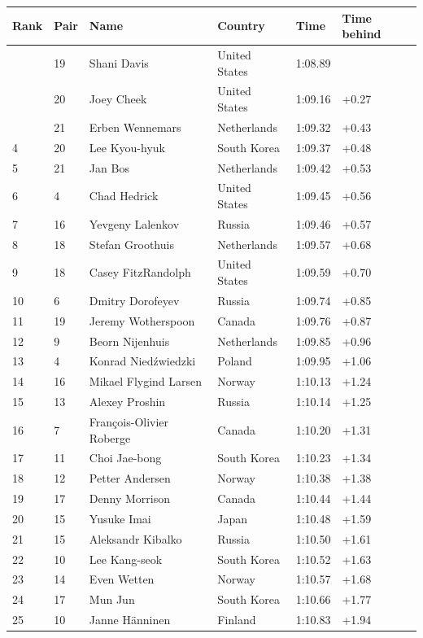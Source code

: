 \documentclass{article}
\begin{document}
\begin{tabular}{llllll}
\toprule
Rank & Pair & Name & Country & Time & Time behind \\
\midrule
 & 19 & Shani Davis & United States & 1:08.89 &  \\
 & 20 & Joey Cheek & United States & 1:09.16 & +0.27 \\
 & 21 & Erben Wennemars & Netherlands & 1:09.32 & +0.43 \\
4 & 20 & Lee Kyou-hyuk & South Korea & 1:09.37 & +0.48 \\
5 & 21 & Jan Bos & Netherlands & 1:09.42 & +0.53 \\
6 & 4 & Chad Hedrick & United States & 1:09.45 & +0.56 \\
7 & 16 & Yevgeny Lalenkov & Russia & 1:09.46 & +0.57 \\
8 & 18 & Stefan Groothuis & Netherlands & 1:09.57 & +0.68 \\
9 & 18 & Casey FitzRandolph & United States & 1:09.59 & +0.70 \\
10 & 6 & Dmitry Dorofeyev & Russia & 1:09.74 & +0.85 \\
11 & 19 & Jeremy Wotherspoon & Canada & 1:09.76 & +0.87 \\
12 & 9 & Beorn Nijenhuis & Netherlands & 1:09.85 & +0.96 \\
13 & 4 & Konrad Niedźwiedzki & Poland & 1:09.95 & +1.06 \\
14 & 16 & Mikael Flygind Larsen & Norway & 1:10.13 & +1.24 \\
15 & 13 & Alexey Proshin & Russia & 1:10.14 & +1.25 \\
16 & 7 & François-Olivier Roberge & Canada & 1:10.20 & +1.31 \\
17 & 11 & Choi Jae-bong & South Korea & 1:10.23 & +1.34 \\
18 & 12 & Petter Andersen & Norway & 1:10.38 & +1.38 \\
19 & 17 & Denny Morrison & Canada & 1:10.44 & +1.44 \\
20 & 15 & Yusuke Imai & Japan & 1:10.48 & +1.59 \\
21 & 15 & Aleksandr Kibalko & Russia & 1:10.50 & +1.61 \\
22 & 10 & Lee Kang-seok & South Korea & 1:10.52 & +1.63 \\
23 & 14 & Even Wetten & Norway & 1:10.57 & +1.68 \\
24 & 17 & Mun Jun & South Korea & 1:10.66 & +1.77 \\
25 & 10 & Janne Hänninen & Finland & 1:10.83 & +1.94 \\

\end{tabular}
\end{document}
